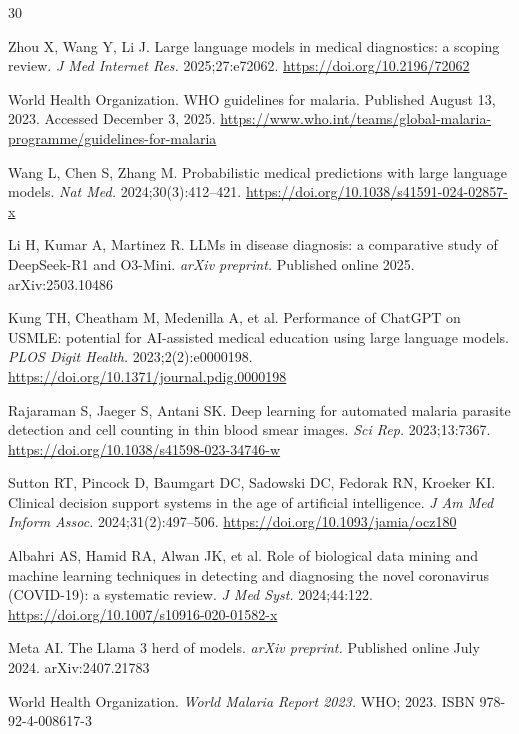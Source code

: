 \documentclass[12pt,a4paper]{article}
\begin{document}
\begin{thebibliography}{30}

Zhou X, Wang Y, Li J. Large language models in medical diagnostics: a scoping review. \textit{J Med Internet Res.} 2025;27:e72062. \url{https://doi.org/10.2196/72062}

World Health Organization. WHO guidelines for malaria. Published August 13, 2023. Accessed December 3, 2025. \url{https://www.who.int/teams/global-malaria-programme/guidelines-for-malaria}

Wang L, Chen S, Zhang M. Probabilistic medical predictions with large language models. \textit{Nat Med.} 2024;30(3):412--421. \url{https://doi.org/10.1038/s41591-024-02857-x}

Li H, Kumar A, Martinez R. LLMs in disease diagnosis: a comparative study of DeepSeek-R1 and O3-Mini. \textit{arXiv preprint.} Published online 2025. arXiv:2503.10486

Kung TH, Cheatham M, Medenilla A, et al. Performance of ChatGPT on USMLE: potential for AI-assisted medical education using large language models. \textit{PLOS Digit Health.} 2023;2(2):e0000198. \url{https://doi.org/10.1371/journal.pdig.0000198}

Rajaraman S, Jaeger S, Antani SK. Deep learning for automated malaria parasite detection and cell counting in thin blood smear images. \textit{Sci Rep.} 2023;13:7367. \url{https://doi.org/10.1038/s41598-023-34746-w}

Sutton RT, Pincock D, Baumgart DC, Sadowski DC, Fedorak RN, Kroeker KI. Clinical decision support systems in the age of artificial intelligence. \textit{J Am Med Inform Assoc.} 2024;31(2):497--506. \url{https://doi.org/10.1093/jamia/ocz180}

Albahri AS, Hamid RA, Alwan JK, et al. Role of biological data mining and machine learning techniques in detecting and diagnosing the novel coronavirus (COVID-19): a systematic review. \textit{J Med Syst.} 2024;44:122. \url{https://doi.org/10.1007/s10916-020-01582-x}

Meta AI. The Llama 3 herd of models. \textit{arXiv preprint.} Published online July 2024. arXiv:2407.21783

World Health Organization. \textit{World Malaria Report 2023.} WHO; 2023. ISBN 978-92-4-008617-3


\end{thebibliography}
\end{document}
